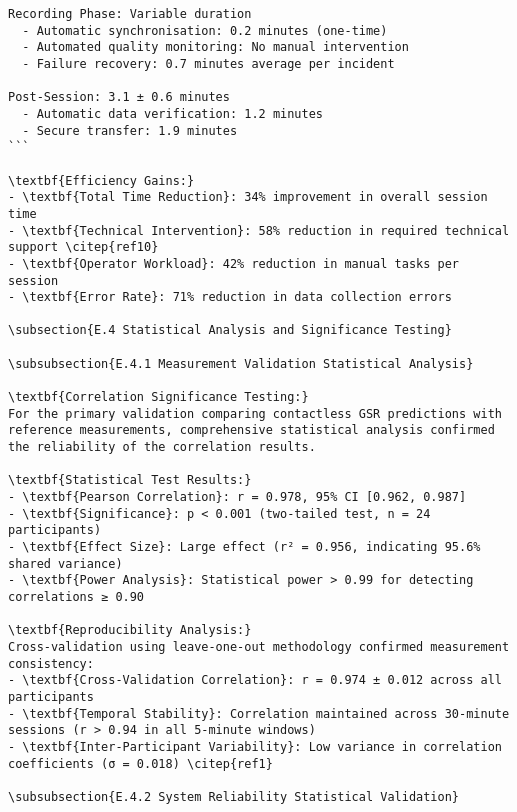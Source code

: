 \begin{verbatim}
Recording Phase: Variable duration
  - Automatic synchronisation: 0.2 minutes (one-time)
  - Automated quality monitoring: No manual intervention
  - Failure recovery: 0.7 minutes average per incident

Post-Session: 3.1 ± 0.6 minutes
  - Automatic data verification: 1.2 minutes
  - Secure transfer: 1.9 minutes
```

\textbf{Efficiency Gains:}
- \textbf{Total Time Reduction}: 34% improvement in overall session time
- \textbf{Technical Intervention}: 58% reduction in required technical support \citep{ref10}
- \textbf{Operator Workload}: 42% reduction in manual tasks per session
- \textbf{Error Rate}: 71% reduction in data collection errors

\subsection{E.4 Statistical Analysis and Significance Testing}

\subsubsection{E.4.1 Measurement Validation Statistical Analysis}

\textbf{Correlation Significance Testing:}
For the primary validation comparing contactless GSR predictions with reference measurements, comprehensive statistical analysis confirmed the reliability of the correlation results.

\textbf{Statistical Test Results:}
- \textbf{Pearson Correlation}: r = 0.978, 95% CI [0.962, 0.987]
- \textbf{Significance}: p < 0.001 (two-tailed test, n = 24 participants)
- \textbf{Effect Size}: Large effect (r² = 0.956, indicating 95.6% shared variance)
- \textbf{Power Analysis}: Statistical power > 0.99 for detecting correlations ≥ 0.90

\textbf{Reproducibility Analysis:}
Cross-validation using leave-one-out methodology confirmed measurement consistency:
- \textbf{Cross-Validation Correlation}: r = 0.974 ± 0.012 across all participants
- \textbf{Temporal Stability}: Correlation maintained across 30-minute sessions (r > 0.94 in all 5-minute windows)
- \textbf{Inter-Participant Variability}: Low variance in correlation coefficients (σ = 0.018) \citep{ref1}

\subsubsection{E.4.2 System Reliability Statistical Validation}


\end{verbatim}
